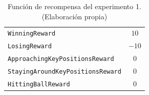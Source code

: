\begin{table}[H]
\centering
    \begin{tabular}{|>{\rowmac}p{6.5cm}|>{\rowmac}c<{\clearrow}|} 
        \hline
        \multicolumn{1}{|c|}{\textbf{Recompensa}} & \multicolumn{1}{c|}{\textbf{Valor}} \\ \hline \hline
        \texttt{WinningReward} & $10$ \\
        \hline
        \texttt{LosingReward} & $-10$ \\
        \hline
        \texttt{ApproachingKeyPositionsReward} & $0$ \\
        \hline
        \texttt{StayingAroundKeyPositionsReward} & $0$ \\
        \hline
        \texttt{HittingBallReward} & $0$ \\
        \hline
    \end{tabular}
    \caption[Función de recompensa del experimento 1]{Función de recompensa del experimento 1. (Elaboración propia)}
    \label{tab:exp1-rewards}
\end{table}


